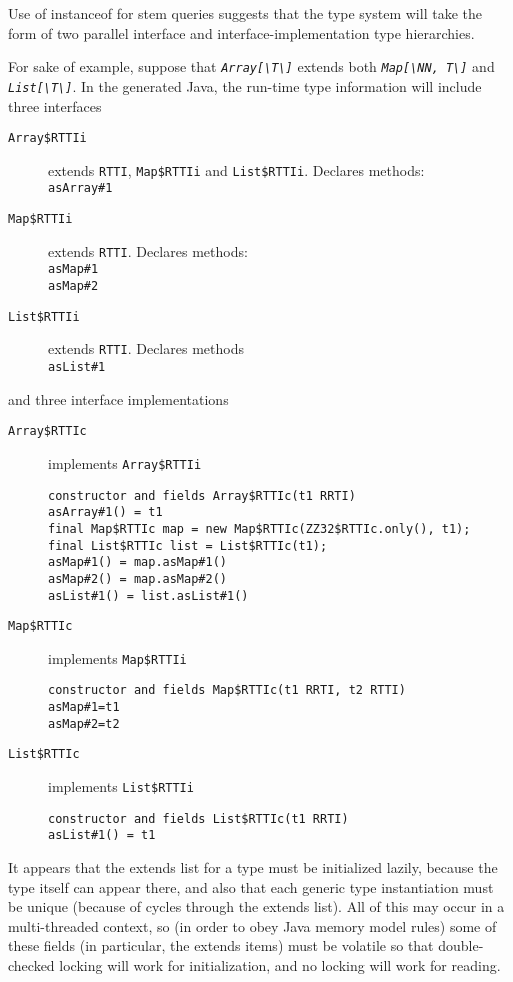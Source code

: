 \documentclass[11pt]{article}
\newcommand{\jvm}[1]{{\tt #1}}
\newcommand{\ftt}[1]{{\tt\slshape{#1}}}
\def\BS{\textbackslash}
\begin{document}
Use of instanceof for stem queries suggests that the type system will take the form of two parallel interface and interface-implementation type hierarchies.

For sake of example, suppose that \ftt{Array[\BS T\BS]} extends both \ftt{Map[\BS NN, T\BS]} and \ftt{List[\BS T\BS]}.  In the generated Java, the run-time type information will include three interfaces
\begin{description}
\item[\jvm{Array\$RTTIi}] extends \jvm{RTTI}, \jvm{Map\$RTTIi} and \jvm{List\$RTTIi}. Declares methods:\\
\jvm{asArray\#1}
\item[\jvm{Map\$RTTIi}] extends \jvm{RTTI}.  Declares methods:\\
\jvm{asMap\#1}\\
\jvm{asMap\#2}
\item[\jvm{List\$RTTIi}] extends \jvm{RTTI}.  Declares methods\\
\jvm{asList\#1}
\end{description}

and three interface implementations
\begin{description}
\item[\jvm{Array\$RTTIc}] implements \jvm{Array\$RTTIi}
{
\begin{verbatim}
constructor and fields Array$RTTIc(t1 RRTI)
asArray#1() = t1
final Map$RTTIc map = new Map$RTTIc(ZZ32$RTTIc.only(), t1);
final List$RTTIc list = List$RTTIc(t1);
asMap#1() = map.asMap#1()
asMap#2() = map.asMap#2()
asList#1() = list.asList#1()
\end{verbatim}
}
\item[\jvm{Map\$RTTIc}] implements \jvm{Map\$RTTIi}
{
\begin{verbatim}
constructor and fields Map$RTTIc(t1 RRTI, t2 RTTI)
asMap#1=t1
asMap#2=t2
\end{verbatim}
}
\item[\jvm{List\$RTTIc}] implements \jvm{List\$RTTIi}
{
\begin{verbatim}
constructor and fields List$RTTIc(t1 RRTI)
asList#1() = t1
\end{verbatim}
}
\end{description}

It appears that the extends list for a type must be initialized lazily, because the type itself can appear there, and also that each generic type instantiation must be unique (because of cycles through the extends list).  All of this may occur in a multi-threaded context, so (in order to obey Java memory model rules) some of these fields (in particular, the extends items) must be volatile so that double-checked locking will work for initialization, and no locking will work for reading.
\end{document}
